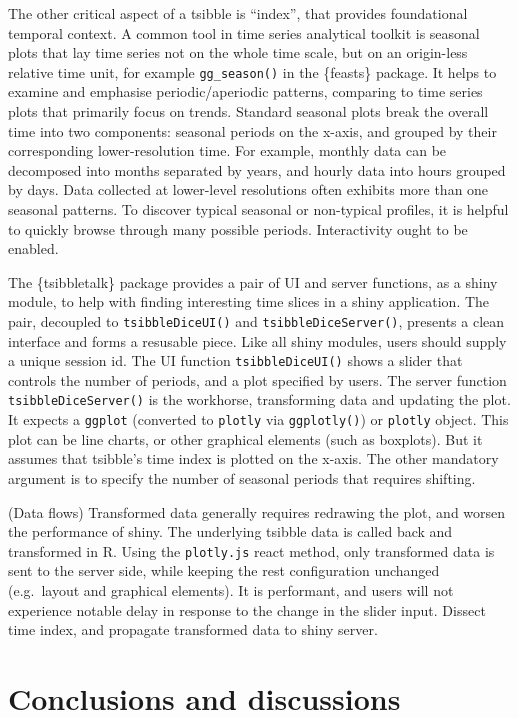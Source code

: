 The other critical aspect of a tsibble is ``index'', that provides
foundational temporal context. A common tool in time series analytical
toolkit is seasonal plots that lay time series not on the whole time
scale, but on an origin-less relative time unit, for example
\texttt{gg\_season()} in the \{feasts\} package. It helps to examine and
emphasise periodic/aperiodic patterns, comparing to time series plots
that primarily focus on trends. Standard seasonal plots break the
overall time into two components: seasonal periods on the x-axis, and
grouped by their corresponding lower-resolution time. For example,
monthly data can be decomposed into months separated by years, and
hourly data into hours grouped by days. Data collected at lower-level
resolutions often exhibits more than one seasonal patterns. To discover
typical seasonal or non-typical profiles, it is helpful to quickly
browse through many possible periods. Interactivity ought to be enabled.

The \{tsibbletalk\} package provides a pair of UI and server functions,
as a shiny module, to help with finding interesting time slices in a
shiny application. The pair, decoupled to \texttt{tsibbleDiceUI()} and
\texttt{tsibbleDiceServer()}, presents a clean interface and forms a
resusable piece. Like all shiny modules, users should supply a unique
session id. The UI function \texttt{tsibbleDiceUI()} shows a slider that
controls the number of periods, and a plot specified by users. The
server function \texttt{tsibbleDiceServer()} is the workhorse,
transforming data and updating the plot. It expects a \texttt{ggplot}
(converted to \texttt{plotly} via \texttt{ggplotly()}) or
\texttt{plotly} object. This plot can be line charts, or other graphical
elements (such as boxplots). But it assumes that tsibble's time index is
plotted on the x-axis. The other mandatory argument is to specify the
number of seasonal periods that requires shifting.

(Data flows) Transformed data generally requires redrawing the plot, and
worsen the performance of shiny. The underlying tsibble data is called
back and transformed in R. Using the \texttt{plotly.js} react method,
only transformed data is sent to the server side, while keeping the rest
configuration unchanged (e.g.~layout and graphical elements). It is
performant, and users will not experience notable delay in response to
the change in the slider input. Dissect time index, and propagate
transformed data to shiny server.

\hypertarget{conclusions-and-discussions}{%
\section{Conclusions and
discussions}\label{conclusions-and-discussions}}

